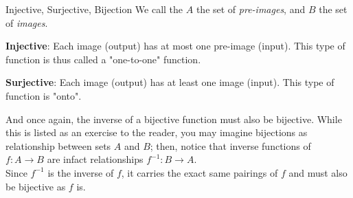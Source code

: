 \begin{ln-define}{Injective, Surjective, Bijection}{}
    We call the $A$ the set of \textit{pre-images}, and $B$ the set of \textit{images}.
    \begin{bindenum}
        \item{
            \textbf{Injective}: Each image (output) has at most one pre-image (input). This type of function is thus called a "one-to-one" function.
            \begin{center}
            \end{center}
        }
        \item{
            \textbf{Surjective}: Each image (output) has at least one image (input). This type of function is "onto".
            \begin{center}
            \end{center}
        }
    \end{bindenum}
\end{ln-define}
And once again, the inverse of a bijective function must also be bijective. While this is listed as an exercise to the reader, you may imagine bijections as relationship between sets $A$ and $B$; then, notice that inverse functions of $f: A \rightarrow B$ are infact relationships $f^{-1}: B \rightarrow A$. \\
Since $f^{-1}$ is the inverse of $f$, it carries the exact same pairings of $f$ and must also be bijective as $f$ is.

